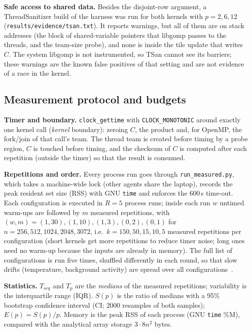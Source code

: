 \documentclass[conference,a4paper]{IEEEtran}
\begin{document}
\textbf{Safe access to shared data.} Besides the disjoint-row argument, a ThreadSanitizer build of the
harness was run for both kernels with $p=2,6,12$ (\texttt{results/evidence/tsan.txt}). It reports
warnings, but all of them are on stack addresses (the block of shared-variable pointers that libgomp
passes to the threads, and the team-size probe), and none is inside the tile update that writes $C$. The
system libgomp is not instrumented, so TSan cannot see its barriers; these warnings are the known false
positives of that setting and are not evidence of a race in the kernel.

\subsection{Measurement protocol and budgets}
\label{sec:protocol}
\textbf{Timer and boundary.} \texttt{clock\_gettime} with \texttt{CLOCK\_MONOTONIC} around exactly one kernel call
(\emph{kernel} boundary): zeroing $C$, the product and, for OpenMP, the fork/join of that call's team.
The thread team is created before timing by a probe region, $C$ is touched before timing, and the
checksum of $C$ is computed after each repetition (outside the timer) so that the result is consumed.

\textbf{Repetitions and order.} Every process run goes through \texttt{run\_measured.py}, which takes
a machine-wide lock (other agents share the laptop), records the peak resident set size (RSS) with
GNU \texttt{time} and enforces the 600\,s time-out. Each configuration is executed in $R=5$ process
runs; inside each run $w$ untimed warm-ups are followed by $m$ measured repetitions, with
$(w,m)=(1,30),(1,10),(1,3),(0,2),(0,1)$ for $n=256,512,1024,2048,3072$, i.e.\ $k=150,50,15,10,5$
measured repetitions per configuration (short kernels get more repetitions to reduce timer noise;
long ones need no warm-up because the inputs are already in memory). The full list of configurations
is run five times, shuffled differently in each round, so that slow drifts (temperature, background
activity) are spread over all configurations~\cite{mytkowicz2009}.

\textbf{Statistics.} $T_{seq}$ and $T_p$ are the \emph{medians} of the measured repetitions; variability
is the interquartile range (IQR). $S(p)$ is the ratio of medians with a 95\% bootstrap confidence
interval (CI; 2000 resamples of both samples); $E(p)=S(p)/p$. Memory is the peak RSS of each process
(GNU \texttt{time} \%M), compared with the analytical array storage $3\cdot8n^2$ bytes.
\end{document}
